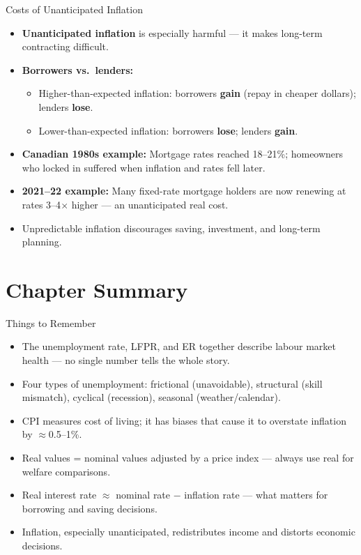 \documentclass[aspectratio=169]{beamer}
\begin{document}
\begin{frame}{Costs of Unanticipated Inflation}
\transfade
\begin{itemize}
  \item \textbf{Unanticipated inflation} is especially harmful --- it makes long-term contracting difficult.
  \item \textbf{Borrowers vs.\ lenders:}
  \begin{itemize}
    \item Higher-than-expected inflation: borrowers \textbf{gain} (repay in cheaper dollars); lenders \textbf{lose}.
    \item Lower-than-expected inflation: borrowers \textbf{lose}; lenders \textbf{gain}.
  \end{itemize}
  \item \textbf{Canadian 1980s example:} Mortgage rates reached 18--21\%; homeowners who locked in suffered when inflation and rates fell later.
  \item \textbf{2021--22 example:} Many fixed-rate mortgage holders are now renewing at rates 3--4$\times$ higher --- an unanticipated real cost.
  \item Unpredictable inflation discourages saving, investment, and long-term planning.
\end{itemize}
\end{frame}

\section*{Chapter Summary}

\begin{frame}{Things to Remember}
\transfade
\begin{itemize}
  \item The unemployment rate, LFPR, and ER together describe labour market health --- no single number tells the whole story.
  \item Four types of unemployment: frictional (unavoidable), structural (skill mismatch), cyclical (recession), seasonal (weather/calendar).
  \item CPI measures cost of living; it has biases that cause it to \alert{overstate} inflation by $\approx$0.5--1\%.
  \item Real values = nominal values adjusted by a price index --- always use real for welfare comparisons.
  \item Real interest rate $\approx$ nominal rate $-$ inflation rate --- what matters for borrowing and saving decisions.
  \item Inflation, especially unanticipated, redistributes income and distorts economic decisions.
\end{itemize}
\end{frame}
\end{document}
